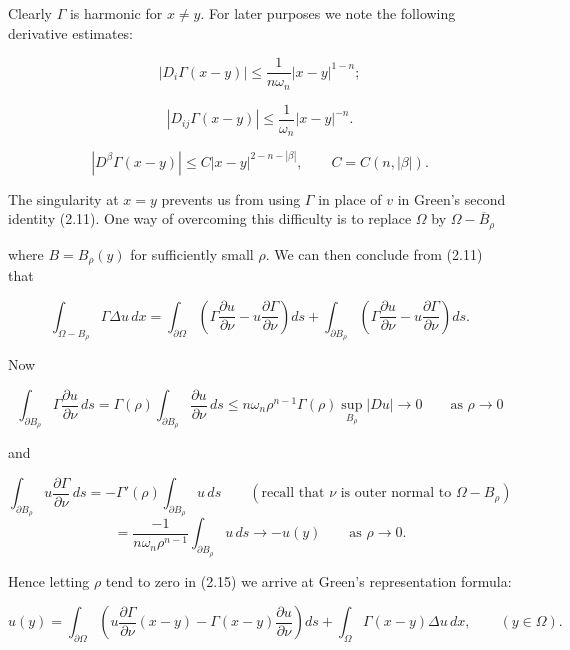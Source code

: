 Clearly $\Gamma$ is harmonic for $x\neq y$. For later purposes we note the following derivative
estimates:

\begin{equation}
|D_i\Gamma(x-y)|\leq \dfrac{1}{n\omega_n}|x-y|^{1-n};
\end{equation}

\begin{equation}
|D_{ij}\Gamma(x-y)|\leq \dfrac{1}{\omega_n}|x-y|^{-n}.
\tag{2.14}
\end{equation}

\[
|D^\beta \Gamma(x-y)|\leq C|x-y|^{2-n-|\beta|},\qquad C=C(n,|\beta|).
\]

The singularity at $x=y$ prevents us from using $\Gamma$ in place of $v$ in Green's second
identity (2.11). One way of overcoming this difficulty is to replace $\Omega$ by $\Omega-\overline{B}_\rho$




where $B = B_\rho(y)$ for sufficiently small $\rho$. We can then conclude from (2.11) that

\begin{equation}
\tag{2.15}
\int_{\Omega-B_\rho} \Gamma \Delta u\,dx
= \int_{\partial\Omega}\left(\Gamma \frac{\partial u}{\partial \nu} - u \frac{\partial \Gamma}{\partial \nu}\right)ds
+ \int_{\partial B_\rho}\left(\Gamma \frac{\partial u}{\partial \nu} - u \frac{\partial \Gamma}{\partial \nu}\right)ds.
\end{equation}

Now

\[
\int_{\partial B_\rho} \Gamma \frac{\partial u}{\partial \nu}\,ds
= \Gamma(\rho)\int_{\partial B_\rho} \frac{\partial u}{\partial \nu}\,ds
\leq n\omega_n \rho^{n-1}\Gamma(\rho)\sup_{B_\rho}|Du|\to 0 \qquad \text{as }\rho\to 0
\]

and

\[
\int_{\partial B_\rho} u \frac{\partial \Gamma}{\partial \nu}\,ds
= -\Gamma'(\rho)\int_{\partial B_\rho} u\,ds \qquad (\text{recall that } \nu \text{ is outer normal to } \Omega-B_\rho)
\]
\[
= \frac{-1}{n\omega_n \rho^{n-1}}\int_{\partial B_\rho} u\,ds \to -u(y) \qquad \text{as }\rho\to 0.
\]

Hence letting $\rho$ tend to zero in (2.15) we arrive at Green's representation formula:

\begin{equation}
\tag{2.16}
u(y)= \int_{\partial\Omega}\left(u \frac{\partial \Gamma}{\partial \nu}(x-y)-\Gamma(x-y)\frac{\partial u}{\partial \nu}\right)ds + \int_{\Omega}\Gamma(x-y)\Delta u\,dx, \qquad (y\in \Omega).
\end{equation}

